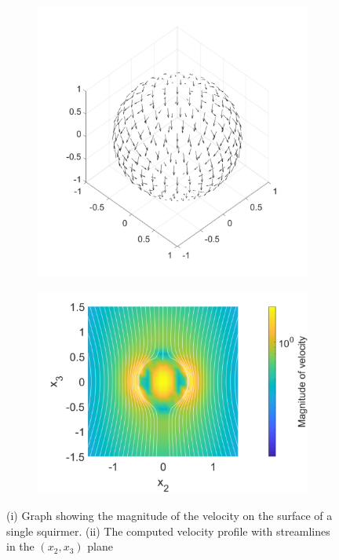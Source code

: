 \begin{figure}
\begin{subfigure}[b]{0.4\textwidth}
    \centering
    \includegraphics[width=\textwidth]{Images/squirmers/Squiremer3D.pdf}
    \caption[]{\label{fig:Squiremer3D}}
\end{subfigure}
\hfill
\begin{subfigure}[b]{0.4\textwidth}
    \centering
    \includegraphics[width=\textwidth]{Images/squirmers/StreamLinesSingle.pdf}
    \caption[]{\label{fig:Squiremer3DFlow}}
\end{subfigure}
\caption[Velocity and Streamlines flow around a single squirmer.]{(i) Graph showing the magnitude of the velocity on the surface of a single squirmer. (ii) The computed velocity profile with streamlines in the $(x_2,x_3)$ plane}
\end{figure}

